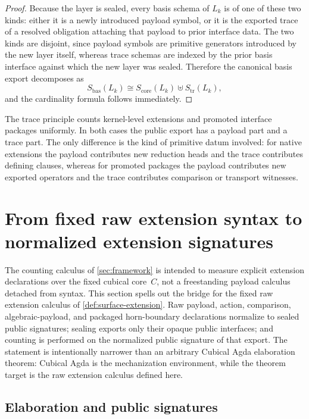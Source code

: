 \documentclass{lmcs}
\begin{document}
\begin{proof}
Because the layer is sealed, every basis schema of $L_k$ is of one of these two kinds: either it is a newly introduced payload symbol, or it is the exported trace of a resolved obligation attaching that payload to prior interface data. The two kinds are disjoint, since payload symbols are primitive generators introduced by the new layer itself, whereas trace schemas are indexed by the prior basis interface against which the new layer was sealed. Therefore the canonical basis export decomposes as
\[
  S_{\mathrm{bas}}(L_k) \cong S_{\mathrm{core}}(L_k) \uplus S_{\mathrm{tr}}(L_k),
\]
and the cardinality formula follows immediately.
\end{proof}

\begin{rem}
\label{rem:trace-native-vs-api}
The trace principle counts kernel-level extensions and promoted interface packages uniformly. In both cases the public export has a payload part and a trace part. The only difference is the kind of primitive datum involved: for native extensions the payload contributes new reduction heads and the trace contributes defining clauses, whereas for promoted packages the payload contributes new exported operators and the trace contributes comparison or transport witnesses.
\end{rem}

\section{From fixed raw extension syntax to normalized extension signatures}
\label{sec:bridge}

The counting calculus of \autoref{sec:framework} is intended to measure explicit extension declarations over the fixed cubical core~$C$, not a freestanding payload calculus detached from syntax. This section spells out the bridge for the fixed raw extension calculus of \autoref{def:surface-extension}. Raw payload, action, comparison, algebraic-payload, and packaged horn-boundary declarations normalize to sealed public signatures; sealing exports only their opaque public interfaces; and counting is performed on the normalized public signature of that export. The statement is intentionally narrower than an arbitrary Cubical Agda elaboration theorem: Cubical Agda is the mechanization environment, while the theorem target is the raw extension calculus defined here.

\subsection{Elaboration and public signatures}
\end{document}
